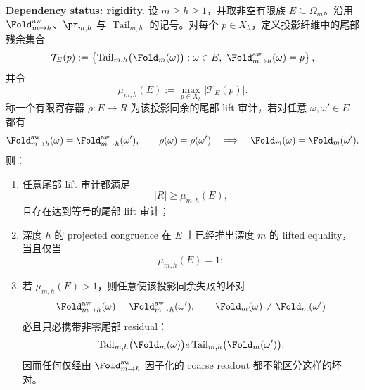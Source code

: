 \begin{theorem}[投影折叠同余的最小尾部严格化]\label{distill:euclid_elements-lifted_congruence_and_residual_rigidity_families-fold-projected-congruence-minimal-tail-strictification}
\textbf{Dependency status: rigidity.}
设 \(m\ge h\ge 1\)，并取非空有限族 \(E\subseteq\Omega_m\)。沿用
\(\Fold^{\rm aw}_{m\to h}\)、\(\pr_{m,h}\) 与
\(\operatorname{Tail}_{m,h}\) 的记号。对每个 \(p\in X_h\)，定义投影纤维中的尾部残余集合
\[
\mathcal T_E(p)
:=
\left\{
\operatorname{Tail}_{m,h}\bigl(\Fold_m(\omega)\bigr):
\omega\in E,\ \Fold^{\rm aw}_{m\to h}(\omega)=p
\right\},
\]
并令
\[
\mu_{m,h}(E):=\max_{p\in X_h}\bigl|\mathcal T_E(p)\bigr|.
\]
称一个有限寄存器 \(\rho:E\to R\) 为该投影同余的尾部 lift 审计，若对任意
\(\omega,\omega'\in E\) 都有
\[
\Fold^{\rm aw}_{m\to h}(\omega)=\Fold^{\rm aw}_{m\to h}(\omega'),\qquad
\rho(\omega)=\rho(\omega')
\quad\Longrightarrow\quad
\Fold_m(\omega)=\Fold_m(\omega').
\]
则：
\begin{enumerate}
  \item 任意尾部 lift 审计都满足
  \[
  |R|\ge \mu_{m,h}(E),
  \]
  且存在达到等号的尾部 lift 审计；
  \item 深度 \(h\) 的 projected congruence 在 \(E\) 上已经推出深度 \(m\) 的 lifted equality，当且仅当
  \[
  \mu_{m,h}(E)=1;
  \]
  \item 若 \(\mu_{m,h}(E)>1\)，则任意使该投影同余失败的坏对
  \[
  \Fold^{\rm aw}_{m\to h}(\omega)=\Fold^{\rm aw}_{m\to h}(\omega'),\qquad
  \Fold_m(\omega)\ne \Fold_m(\omega')
  \]
  必且只必携带非零尾部 residual：
  \[
  \operatorname{Tail}_{m,h}\bigl(\Fold_m(\omega)\bigr)
e
  \operatorname{Tail}_{m,h}\bigl(\Fold_m(\omega')\bigr).
  \]
  因而任何仅经由 \(\Fold^{\rm aw}_{m\to h}\) 因子化的 coarse readout 都不能区分这样的坏对。
\end{enumerate}
\end{theorem}
